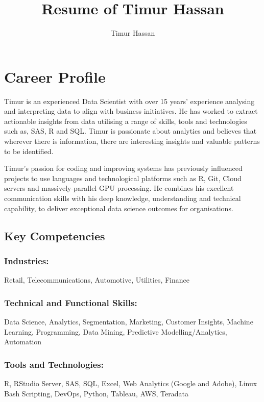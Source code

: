 \documentclass{article}
\begin{document}
\title{Resume of Timur Hassan}
\author{Timur Hassan}


\maketitle

\section{Career Profile}
Timur is an experienced Data Scientist with over 15 years’ experience analysing and interpreting data to align with business initiatives. He has worked to extract actionable insights from
data utilising a range of skills, tools and technologies such as, SAS, R and SQL. Timur is passionate about analytics and believes that wherever there is information, there are interesting insights and
valuable patterns to be identified.

Timur's passion for coding and improving systems has previously influenced projects to use languages and technological platforms such as R, Git, Cloud servers and massively-parallel GPU
processing. He combines his excellent communication skills with his deep knowledge, understanding and technical capability, to deliver exceptional data science outcomes for organisations.

\subsection{Key Competencies}
\subsubsection{Industries:}
Retail, Telecommunications, Automotive, Utilities, Finance

\subsubsection{Technical and Functional Skills:}
Data Science, Analytics, Segmentation, Marketing, Customer Insights, Machine Learning, Programming, Data Mining, Predictive Modelling/Analytics, Automation

\subsubsection{Tools and Technologies:}
R, RStudio Server, SAS, SQL, Excel, Web Analytics (Google and Adobe), Linux Bash Scripting, DevOps, Python, Tableau, AWS, Teradata
\end{document}
